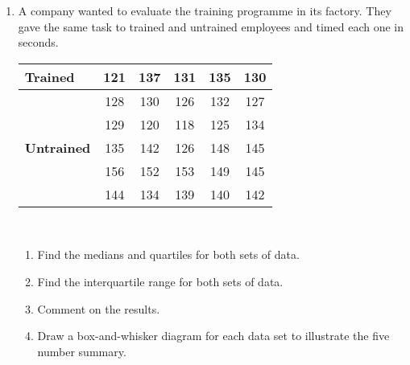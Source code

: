 \begin{eocexercises}{}
\begin{enumerate}[itemsep=6pt, label=\textbf{\arabic*}.]
  \item A company wanted to evaluate the training programme in its
    factory. They gave the same task to trained and untrained
    employees and timed each one in seconds.
\\
    \begin{center}
      \begin{tabular}{|l|c|c|c|c|c|} \hline

        \textbf{Trained} & 121 & 137 & 131 & 135 & 130 \\ \hline
                         & 128 & 130 & 126 & 132 & 127 \\\hline
                         & 129 & 120 & 118 & 125 & 134 \\\hline

        \textbf{Untrained} & 135 & 142 & 126 & 148 & 145 \\\hline
                           & 156 & 152 & 153 & 149 & 145 \\\hline
                           & 144 & 134 & 139 & 140 & 142 \\\hline

      \end{tabular}
    \end{center}
\vspace {8pt}\\
    \begin{enumerate}[noitemsep, label=\textbf{(\alph*)} ]
    \item Find the medians and quartiles for both sets of data.
    \item Find the interquartile range for both sets of data.
    \item Comment on the results.
    \item Draw a box-and-whisker diagram for each data set to illustrate the five number summary.
    \end{enumerate}


\end{enumerate}
\end{eocexercises}
